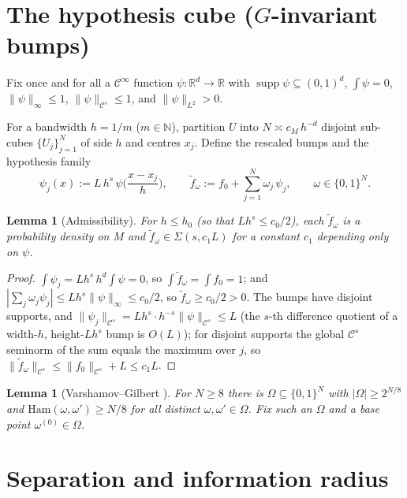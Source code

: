 \documentclass[11pt]{article}
\theoremstyle{plain}
\newtheorem{lemma}[theorem]{Lemma}
\theoremstyle{definition}
\theoremstyle{remark}
\newcommand{\R}{\mathbb{R}}
\newcommand{\N}{\mathbb{N}}
\newcommand{\Ham}{\mathrm{Ham}}
\DeclareMathOperator{\supp}{supp}
\begin{document}
\section{The hypothesis cube ($G$-invariant bumps)}

Fix once and for all a $\mathcal C^\infty$ function $\psi:\R^d\to\R$ with
$\supp\psi\subseteq(0,1)^d$, $\int\psi=0$, $\|\psi\|_\infty\le1$,
$\|\psi\|_{\mathcal C^s}\le1$, and $\|\psi\|_{L^2}>0$.

For a bandwidth $h=1/m$ ($m\in\N$), partition $U$ into $N\asymp c_M\,h^{-d}$
disjoint sub-cubes $\{U_j\}_{j=1}^N$ of side $h$ and centres $x_j$. Define the
rescaled bumps and the hypothesis family
\begin{equation}\label{eq:bumps}
\psi_j(x):=L\,h^{s}\,\psi\!\Big(\frac{x-x_j}{h}\Big),\qquad
\tilde f_\omega := f_0+\sum_{j=1}^N\omega_j\,\psi_j,\qquad \omega\in\{0,1\}^N .
\end{equation}

\begin{lemma}[Admissibility]\label{lem:admiss}
For $h\le h_0$ (so that $L h^s\le c_0/2$), each $\tilde f_\omega$ is a probability
density on $M$ and $\tilde f_\omega\in\Sigma(s,c_1L)$ for a constant $c_1$
depending only on $\psi$.
\end{lemma}

\begin{proof}
$\int\psi_j=Lh^s\,h^d\int\psi=0$, so $\int\tilde f_\omega=\int f_0=1$; and
$|\sum_j\omega_j\psi_j|\le Lh^s\|\psi\|_\infty\le c_0/2$, so
$\tilde f_\omega\ge c_0/2>0$. The bumps have disjoint supports, and
$\|\psi_j\|_{\mathcal C^s}=Lh^s\cdot h^{-s}\|\psi\|_{\mathcal C^s}\le L$ (the
$s$-th difference quotient of a width-$h$, height-$Lh^s$ bump is $O(L)$); for
disjoint supports the global $\mathcal C^s$ seminorm of the sum equals the maximum
over $j$, so $\|\tilde f_\omega\|_{\mathcal C^s}\le\|f_0\|_{\mathcal C^s}+L\le c_1L$.
\end{proof}

\begin{lemma}[Varshamov--Gilbert {\cite[Lem.~2.9]{tsybakov}}]\label{lem:vg}
For $N\ge8$ there is $\Omega\subseteq\{0,1\}^N$ with $|\Omega|\ge2^{N/8}$ and
$\Ham(\omega,\omega')\ge N/8$ for all distinct $\omega,\omega'\in\Omega$. Fix such
an $\Omega$ and a base point $\omega^{(0)}\in\Omega$.
\end{lemma}

\section{Separation and information radius}
\end{document}

